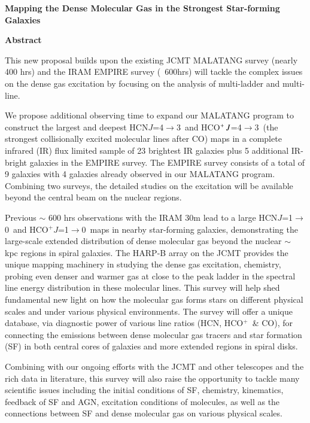 \documentclass[legal,11pt]{article}
\def\,{\thinspace}
\def\HCOP       {HCO$^{+}$}
\def\HCNoz      {HCN\,$J$=1$\rightarrow$0}
\def\HCOPoz      {HCO$^+$\,$J$=1$\rightarrow$0}
\def\HCNft        {HCN\,$J$=4$\rightarrow$3}
\def\HCOPft     {HCO$^+\,J$=4$\rightarrow$3}
\begin{document}
\begin{center}
        {\large\bf Mapping the Dense Molecular Gas in the Strongest Star-forming Galaxies}


\vspace { 0.5 cm}
 {\Large\bf Abstract} 
\justify
{{
This new proposal builds upon the existing JCMT MALATANG survey (nearly 400 hrs) and
the IRAM EMPIRE survey (~600hrs) will tackle the complex issues on the dense gas 
excitation by focusing on the analysis of multi-ladder and multi-line. 

We propose additional observing time to expand our MALATANG program to construct 
the largest and deepest \HCNft\ and \HCOPft\ (the strongest collisionally excited 
molecular lines after CO) maps in a complete infrared (IR) flux limited sample of 23
brightest IR galaxies plus 5 additional IR-bright galaxies in the EMPIRE survey. 
The EMPIRE survey consists of a total of 9 galaxies with 4 galaxies already observed in
our MALATANG program. Combining two surveys, the detailed studies on the excitation will be available beyond
the central beam on the nuclear regions.

Previous $\sim$ 600 hrs observations with the IRAM 30m lead to a large \HCNoz\ and \HCOPoz{}\  maps
in nearby star-forming galaxies, demonstrating the large-scale extended distribution of dense molecular 
gas beyond the nuclear $\sim$ kpc regions in spiral galaxies. The HARP-B array on 
the JCMT provides the unique mapping machinery in studying the dense gas excitation, 
chemistry, probing even denser and warmer gas at close to the peak ladder in the 
spectral line energy distribution in these molecular lines.  This survey will help 
shed fundamental new light on how the molecular gas forms stars on different 
physical scales and under various physical environments.  The survey will offer a unique
database, via diagnostic power of various line ratios (HCN, \HCOP\ \& CO),  for 
connecting the emissions between dense molecular gas tracers and star formation (SF) 
in both central cores of galaxies and more extended regions in spiral disks. 

Combining with our ongoing efforts with the JCMT and other telescopes and the 
rich data in literature, this survey will also raise the opportunity to tackle 
many scientific issues including the initial conditions of SF, chemistry, kinematics,
feedback of SF and AGN, excitation conditions of molecules, as well as the connections 
between SF and dense molecular gas on various physical scales. 

}}
\end{center}
\end{document}
